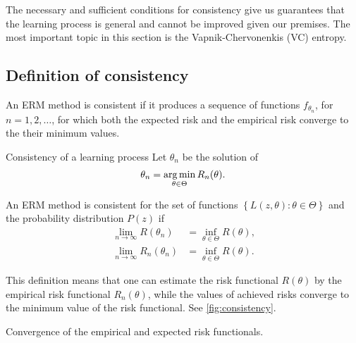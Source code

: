 The necessary and sufficient conditions for consistency give us guarantees that the learning
process is general and cannot be improved given our premises.  The most important topic in
this section is the Vapnik-Chervonenkis (VC) entropy.

\subsection{Definition of consistency}

An ERM method is consistent if it produces a sequence of functions $f_{\theta_n}$, for
$n = 1, 2, \dots$, for which both the expected risk and the empirical risk converge to the
their minimum values.

\begin{defbox}{Consistency of a learning process}{}
  Let $\theta_n$ be the solution of
  \begin{equation*}
    \theta_n = \operatorname*{arg\,min}_{\theta \in \Theta} R_n(\theta)\text{.}
  \end{equation*}

  An ERM method is consistent for the set of functions $\left\{ L(z, \theta) : \theta \in
  \Theta \right\}$ and the probability distribution $P(z)$ if
  \begin{align*}
    \lim_{n \to \infty} R(\theta_n) &= \inf_{\theta \in \Theta} R(\theta)\text{,} \\
    \lim_{n \to \infty} R_n(\theta_n) &= \inf_{\theta \in \Theta} R(\theta)\text{.}
  \end{align*}
\end{defbox}

This definition means that one can estimate the risk functional $R(\theta)$ by the
empirical risk functional $R_n(\theta)$, while the values of achieved risks converge to
the minimum value of the risk functional.  See \cref{fig:consistency}.

\begin{figurebox}[label=fig:consistency]{Convergence of the empirical and expected risk functionals.}
  \centering
\end{figurebox}

